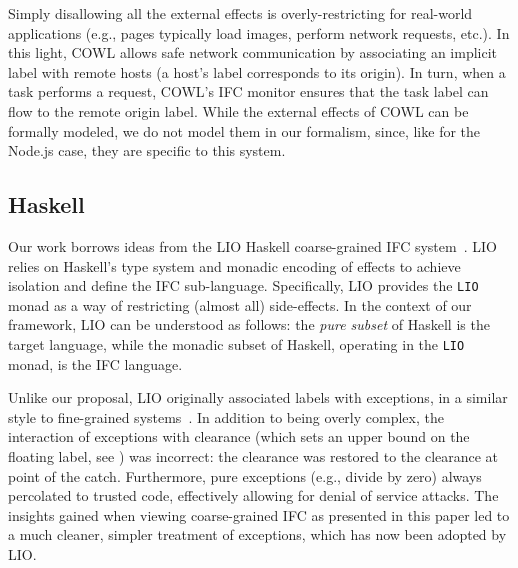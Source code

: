 Simply disallowing all the external effects is overly-restricting for
real-world applications (e.g., pages typically load images, perform
network requests, etc.).
%
In this light, COWL allows safe network communication by associating an
implicit label with remote hosts (a host's label corresponds to
its origin).
%
In turn, when a task performs a request, COWL's IFC monitor
ensures that the task label can flow to the remote origin label.
%
While the external effects of COWL can be formally modeled, we do not
model them in our formalism, %
since, like for the
Node.js case, they are specific to this system.
%



\subsection{Haskell}
\label{sec:real:hs}
Our work borrows ideas from the LIO Haskell coarse-grained IFC
system~\cite{lio, stefan:addressing-covert}.
%
LIO relies on Haskell's type system and monadic encoding of
effects to achieve isolation and define the IFC sub-language.
%
Specifically, LIO provides the \verb|LIO| monad as a way of restricting
(almost all) side-effects.
%
In the context of our framework, LIO can be understood as follows: the
\emph{pure subset} of Haskell is the target language, while the
monadic subset of Haskell, operating in the \verb|LIO| monad, is the
IFC language.

%
Unlike our proposal, LIO originally associated labels with exceptions, in a
similar style to fine-grained
systems~\cite{stefan:2012:arxiv-flexible, Hritcu:2013:YIB:2497621.2498098}.
%
In addition to being overly complex, the interaction of exceptions
with clearance (which sets an upper bound on the floating label, see
) was incorrect: the clearance
was restored to the clearance at point of the catch.
%
Furthermore, pure exceptions (e.g., divide by zero) always percolated to
trusted code, effectively allowing for denial of service attacks.
%
The insights gained when viewing coarse-grained IFC as presented in this
paper led to a much cleaner, simpler treatment of exceptions,
which has now been adopted by LIO.






